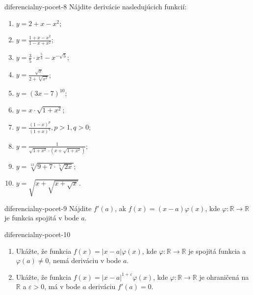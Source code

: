 \begin{defproblem}{diferencialny-pocet-8}
Nájdite derivácie nasledujúcich funkcií:
\begin{multicols}{2}
\begin{enumerate}
    \item $y=2+x-x^2$;
    \item $y=\frac{1+x-x^2}{1-x+x^2}$;
    \item $y=\frac{3}{5}\cdot x^{\frac{5}{3}}-x^{-\sqrt{5}}$;
    \item $y=\frac{\sqrt{x}}{2+\sqrt[3]{x^2}}$;
    \item $y=(3x-7)^{10}$;
    \item $y=x\cdot \sqrt{1+x^2}$;
    \item $y=\frac{(1-x)^p}{(1+x)^q},p>1,q>0$;
    \item $y=\frac{1}{\sqrt{1+x^2}\cdot (x+\sqrt{1+x^2})}$;
    \item $y=\sqrt[13]{9+7\cdot \sqrt[5]{2x}}$;
    \item $y=\sqrt{x+\sqrt{x+\sqrt{x}}}$.
\end{enumerate}
\end{multicols}
\end{defproblem}

\begin{defproblem}{diferencialny-pocet-9}
Nájdite $f'(a)$, ak $f(x)=(x-a)\varphi(x)$, kde $\varphi:\mathbb{R}\rightarrow\mathbb{R}$ je funkcia spojitá v bode $a$.
\end{defproblem}

\begin{defproblem}{diferencialny-pocet-10}
\begin{enumerate}
\item Ukážte, že funkcia $f(x)=|x-a|\varphi(x)$, kde $\varphi:\mathbb{R}\rightarrow\mathbb{R}$ je spojitá funkcia a $\varphi(a) \neq 0$, nemá deriváciu v bode $a$.
\item Ukážte, že funkcia $f(x)=|x-a|^{1+\varepsilon}\varphi(x)$, kde $\varphi:\mathbb{R}\rightarrow\mathbb{R}$  je ohraničená na $\mathbb{R}$ a $\varepsilon>0$, má v bode $a$ deriváciu $f'(a)=0$.
\end{enumerate}
\end{defproblem}

